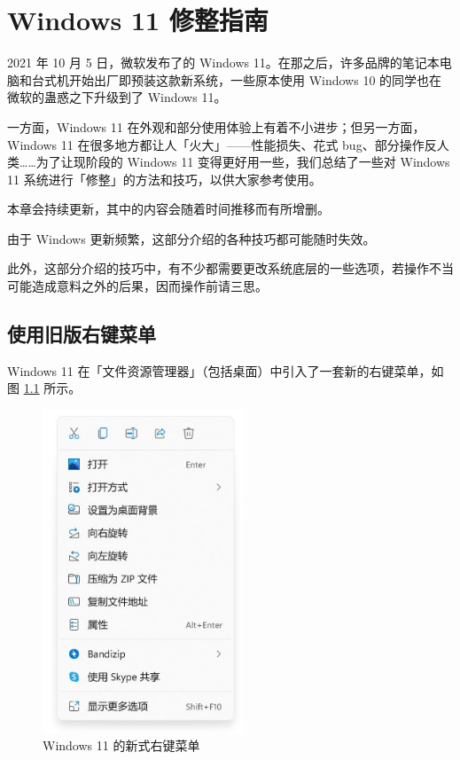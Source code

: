 \chapter{Windows 11 修整指南}
\label{windows-11-optimization}

\begin{intro}
  2021 年 10 月 5 日，微软发布了的 Windows 11。在那之后，许多品牌的笔记本电脑和台式机开始出厂即预装这款新系统，一些原本使用 Windows 10 的同学也在微软的蛊惑之下升级到了 Windows 11。

  一方面，Windows 11 在外观和部分使用体验上有着不小进步；但另一方面，Windows 11 在很多地方都让人「火大」——性能损失、花式 bug、部分操作反人类……为了让现阶段的 Windows 11 变得更好用一些，我们总结了一些对 Windows 11 系统进行「修整」的方法和技巧，以供大家参考使用。
\end{intro}

\begin{note}
  本章会持续更新，其中的内容会随着时间推移而有所增删。
\end{note}

\begin{warning}
  由于 Windows 更新频繁，这部分介绍的各种技巧都可能随时失效。

  此外，这部分介绍的技巧中，有不少都需要更改系统底层的一些选项，若操作不当可能造成意料之外的后果，因而操作前请三思。
\end{warning}

\section{使用旧版右键菜单}

Windows 11 在「文件资源管理器」（包括桌面）中引入了一套新的右键菜单，如图 \ref{New_menu} 所示。

\begin{figure}[htb!]
  \centering
  \includegraphics[width=6cm]{assets/New_menu.jpg}
  \caption{Windows 11 的新式右键菜单}
  \label{New_menu}
\end{figure}

